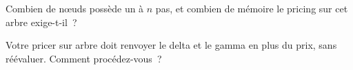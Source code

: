 \begin{interviewq}\label{iq:dv:the-binomial-model:5}
Combien de nœuds possède un  à $n$ pas, et combien de mémoire
le pricing sur cet arbre exige-t-il~?
\end{interviewq}

\begin{interviewq}\label{iq:dv:the-binomial-model:6}
Votre pricer sur arbre doit renvoyer le delta et le gamma en plus du prix, sans
réévaluer. Comment procédez-vous~?
\end{interviewq}
